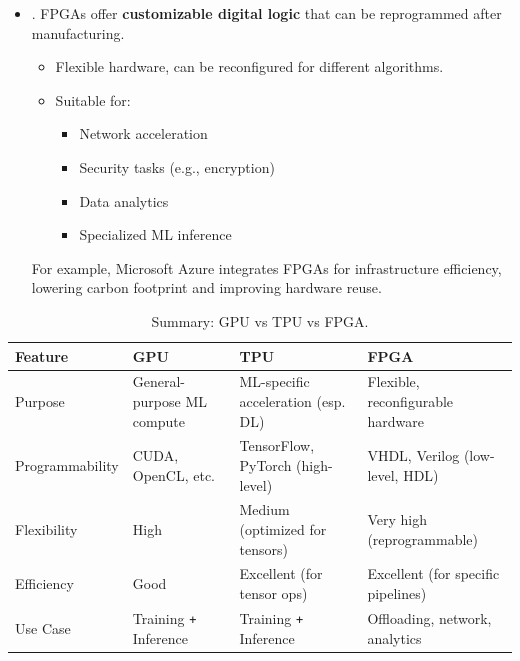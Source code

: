 \begin{itemize}
    
    \item {}. FPGAs offer \textbf{customizable digital logic} that can be reprogrammed after manufacturing.
    \begin{itemize}
        \item Flexible hardware, can be reconfigured for different algorithms.
        \item Suitable for:
        \begin{itemize}
            \item Network acceleration
            \item Security tasks (e.g., encryption)
            \item Data analytics
            \item Specialized ML inference
        \end{itemize}
    \end{itemize}
    For example, Microsoft Azure integrates FPGAs for infrastructure efficiency, lowering carbon footprint and improving hardware reuse.
\end{itemize}

\newpage

\begin{table}[!htp]
    \centering
    \begin{adjustbox}{width={\textwidth},totalheight={\textheight},keepaspectratio}
        \begin{tabular}{@{} l | l | l | l @{}}
            \toprule
            \textbf{Feature} & \textbf{GPU} & \textbf{TPU} & \textbf{FPGA} \\
            \midrule
            Purpose         & General-purpose ML compute    & ML-specific acceleration (esp. DL) & Flexible, reconfigurable hardware  \\ [.5em]
            Programmability & CUDA, OpenCL, etc.            & TensorFlow, PyTorch (high-level)   & VHDL, Verilog (low-level, HDL)     \\ [.5em]
            Flexibility     & High                          & Medium (optimized for tensors)     & Very high (reprogrammable)         \\ [.5em]
            Efficiency      & Good                          & Excellent (for tensor ops)         & Excellent (for specific pipelines) \\ [.5em]
            Use Case        & Training \texttt{+} Inference & Training \texttt{+} Inference      & Offloading, network, analytics     \\
            \bottomrule
        \end{tabular}
    \end{adjustbox}
    \caption{Summary: GPU vs TPU vs FPGA.}
\end{table}

